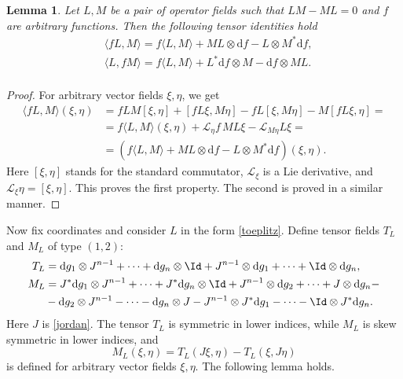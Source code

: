 \documentclass[12pt]{article}
\newtheorem{Lemma}{Lemma}[section]
\theoremstyle{remark}
\newcommand{\ddd}{\mathrm{d}}
\begin{document}
\begin{Lemma}\label{lm0}
Let $L, M$ be a pair of operator fields such that $LM - ML = 0$ and $f$ are arbitrary functions. Then the following tensor identities hold
\begin{equation}\label{ii:tensor}
    \begin{aligned}
       & \langle f L, M \rangle = f \langle L, M \rangle + M L \otimes \ddd f - L \otimes M^* \ddd f, \\
       & \langle L, f M \rangle = f \langle L, M \rangle + L^* \ddd f \otimes M - \ddd f \otimes ML. \\
\end{aligned}
\end{equation}    
\end{Lemma}
\begin{proof}
For arbitrary vector fields $\xi, \eta$, we get
$$
\begin{aligned}
 \langle f L, M \rangle (\xi, \eta) & = f LM[\xi, \eta] + [f L\xi, M\eta] - f L[\xi, M\eta] - M[f L\xi, \eta] = \\
 & = f \langle L, M \rangle(\xi, \eta) + \mathcal L_\eta f \, ML \xi - \mathcal L_{M\eta} L\xi = \\
 & = (f\langle L, M \rangle + ML \otimes \ddd f - L \otimes M^*\ddd f) (\xi, \eta).
\end{aligned}
$$
Here $[\xi, \eta]$ stands for the standard commutator, $\mathcal L_\xi$ is a Lie derivative, and $\mathcal L_\xi \eta = [\xi, \eta]$. This proves the first property. The second is proved in a similar manner.
\end{proof}

Now fix coordinates and consider $L$ in the form \eqref{toeplitz}. Define tensor fields $T_L$ and $M_L$ of type $(1, 2)$:
$$
\begin{aligned}
T_L & = \ddd g_1 \otimes J^{n - 1} + \dots + \ddd g_n \otimes \Id + J^{n - 1} \otimes \ddd g_1 + \dots + \Id \otimes \ddd g_n, \\
M_L & = J^*\ddd g_1 \otimes J^{n - 1} + \dots + J^*\ddd g_n \otimes \Id + J^{n - 1} \otimes \ddd g_2 + \dots + J \otimes \ddd g_n - \\
& - \ddd g_2 \otimes J^{n - 1} - \dots - \ddd g_n \otimes J - J^{n - 1} \otimes J^* \ddd g_1 - \dots - \Id \otimes J^*\ddd g_n.
\end{aligned}
$$
Here $J$ is \eqref{jordan}. The tensor $T_L$ is symmetric in lower indices, while $M_L$ is skew symmetric in lower indices, and $$ M_L (\xi, \eta) = T_L(J\xi, \eta) - T_L(\xi, J \eta)
$$
is defined for arbitrary vector fields $\xi, \eta$. The following lemma holds.
\end{document}
